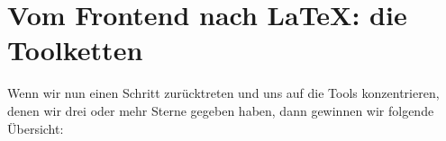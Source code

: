 %
%
%

\section{Vom Frontend nach \LaTeX: die Toolketten}

Wenn wir nun einen Schritt zurücktreten und uns auf die
Tools konzentrieren, denen wir drei oder mehr Sterne gegeben haben, dann
gewinnen wir folgende Übersicht:


